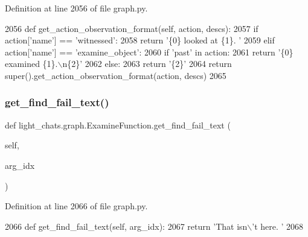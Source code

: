 Definition at line 2056 of file graph.\+py.


\begin{DoxyCode}
2056     \textcolor{keyword}{def }get\_action\_observation\_format(self, action, descs):
2057         \textcolor{keywordflow}{if} action[\textcolor{stringliteral}{'name'}] == \textcolor{stringliteral}{'witnessed'}:
2058             \textcolor{keywordflow}{return} \textcolor{stringliteral}{'\{0\} looked at \{1\}. '}
2059         \textcolor{keywordflow}{elif} action[\textcolor{stringliteral}{'name'}] == \textcolor{stringliteral}{'examine\_object'}:
2060             \textcolor{keywordflow}{if} \textcolor{stringliteral}{'past'} \textcolor{keywordflow}{in} action:
2061                 \textcolor{keywordflow}{return} \textcolor{stringliteral}{'\{0\} examined \{1\}.\(\backslash\)n\{2\}'}
2062             \textcolor{keywordflow}{else}:
2063                 \textcolor{keywordflow}{return} \textcolor{stringliteral}{'\{2\}'}
2064         \textcolor{keywordflow}{return} super().get\_action\_observation\_format(action, descs)
2065 
\end{DoxyCode}
\mbox{\label{classlight__chats_1_1graph_1_1ExamineFunction_a0f0eedfae1c6a0cdf83f94c6bc709128}} 
\subsubsection{\texorpdfstring{get\+\_\+find\+\_\+fail\+\_\+text()}{get\_find\_fail\_text()}}
{\footnotesize\ttfamily def light\+\_\+chats.\+graph.\+Examine\+Function.\+get\+\_\+find\+\_\+fail\+\_\+text (\begin{DoxyParamCaption}\item[{}]{self,  }\item[{}]{arg\+\_\+idx }\end{DoxyParamCaption})}



Definition at line 2066 of file graph.\+py.


\begin{DoxyCode}
2066     \textcolor{keyword}{def }get\_find\_fail\_text(self, arg\_idx):
2067         \textcolor{keywordflow}{return} \textcolor{stringliteral}{'That isn\(\backslash\)'t here. '}
2068 
\end{DoxyCode}
\mbox{\label{classlight__chats_1_1graph_1_1ExamineFunction_a93ba8b835d12b96746a1548583e62887}} 
